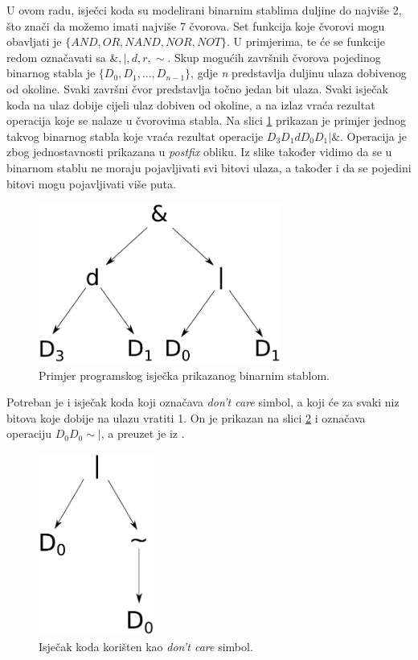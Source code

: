 \documentclass[times, utf8, zavrsni]{fer}
\begin{document}
U ovom radu, isječci koda su modelirani binarnim stablima duljine do najviše 2, što znači da možemo imati najviše 7 čvorova.
Set funkcija koje čvorovi mogu obavljati je $\{AND, OR, NAND, NOR, NOT\}$.
U primjerima, te će se funkcije redom označavati sa $\&, |, d, r, \sim$.
Skup mogućih završnih čvorova pojedinog binarnog stabla je $\{D_{0}, D_{1}, ..., D_{n - 1}\}$, gdje \emph{n} predstavlja duljinu ulaza dobivenog od okoline.
Svaki završni čvor predstavlja točno jedan bit ulaza.
Svaki isječak koda na ulaz dobije cijeli ulaz dobiven od okoline, a na izlaz vraća rezultat operacija koje se nalaze u čvorovima stabla.
Na slici \ref{tree} prikazan je primjer jednog takvog binarnog stabla koje vraća rezultat operacije $D_{3}D_{1}dD_{0}D_{1}|\&$.
Operacija je zbog jednostavnosti prikazana u \emph{postfix} obliku.
Iz slike također vidimo da se u binarnom stablu ne moraju pojavljivati svi bitovi ulaza, a također i da se pojedini bitovi mogu pojavljivati više puta.

\begin{figure}[h]
\centering
\includegraphics[width=8cm]{img/tree.pdf}
\caption{Primjer programskog isječka prikazanog binarnim stablom.}
\label{tree}
\end{figure}

Potreban je i isječak koda koji označava \emph{don't care} simbol, a koji će za svaki niz bitova koje dobije na ulazu vratiti 1.
On je prikazan na slici \ref{dnc} i označava operaciju $D_{0}D_{0}\sim|$, a preuzet je iz \citep{4}.

\begin{figure}[h]
\centering
\includegraphics[height=6cm]{img/dnc.pdf}
\caption{Isječak koda korišten kao \emph{don't care} simbol.}
\label{dnc}
\end{figure}
\end{document}
